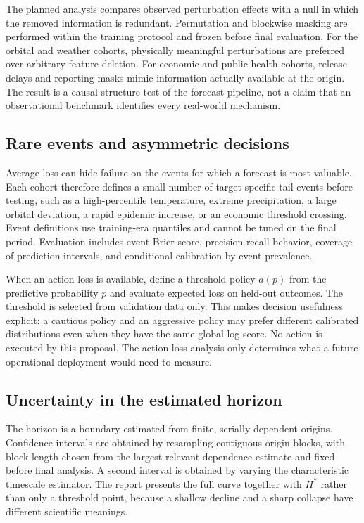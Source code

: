 \documentclass[conference]{IEEEtran}
\begin{document}
The planned analysis compares observed perturbation effects with a null in which the removed information is redundant. Permutation and blockwise masking are performed within the training protocol and frozen before final evaluation. For the orbital and weather cohorts, physically meaningful perturbations are preferred over arbitrary feature deletion. For economic and public-health cohorts, release delays and reporting masks mimic information actually available at the origin. The result is a causal-structure test of the forecast pipeline, not a claim that an observational benchmark identifies every real-world mechanism.

\subsection{Rare events and asymmetric decisions}
Average loss can hide failure on the events for which a forecast is most valuable. Each cohort therefore defines a small number of target-specific tail events before testing, such as a high-percentile temperature, extreme precipitation, a large orbital deviation, a rapid epidemic increase, or an economic threshold crossing. Event definitions use training-era quantiles and cannot be tuned on the final period. Evaluation includes event Brier score, precision-recall behavior, coverage of prediction intervals, and conditional calibration by event prevalence.

When an action loss is available, define a threshold policy $a(p)$ from the predictive probability $p$ and evaluate expected loss on held-out outcomes. The threshold is selected from validation data only. This makes decision usefulness explicit: a cautious policy and an aggressive policy may prefer different calibrated distributions even when they have the same global log score. No action is executed by this proposal. The action-loss analysis only determines what a future operational deployment would need to measure.

\subsection{Uncertainty in the estimated horizon}
The horizon is a boundary estimated from finite, serially dependent origins. Confidence intervals are obtained by resampling contiguous origin blocks, with block length chosen from the largest relevant dependence estimate and fixed before final analysis. A second interval is obtained by varying the characteristic timescale estimator. The report presents the full curve together with $H^*$ rather than only a threshold point, because a shallow decline and a sharp collapse have different scientific meanings.
\end{document}
